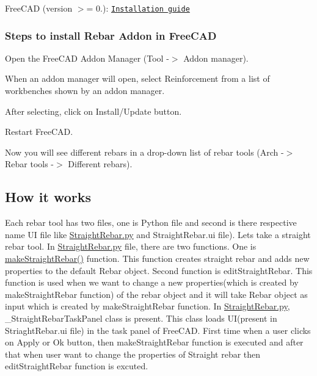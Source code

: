 \begin{DoxyItemize}
\item Free\+C\+AD (version $>$= 0.)\+: \href{https://www.freecadweb.org/wiki/Installing}{\tt Installation guide}
\end{DoxyItemize}

\subsubsection*{Steps to install Rebar Addon in Free\+C\+AD}


\begin{DoxyEnumerate}
\item Open the Free\+C\+AD Addon Manager ({\ttfamily Tool -\/$>$ Addon manager}).
\item When an addon manager will open, select {\ttfamily Reinforcement} from a list of workbenches shown by an addon manager.
\item After selecting, click on {\ttfamily Install/\+Update} button.
\item Restart Free\+C\+AD.
\item Now you will see different rebars in a drop-\/down list of rebar tools ({\ttfamily Arch -\/$>$ Rebar tools -\/$>$ Different rebars}).
\end{DoxyEnumerate}

\subsection*{How it works}

Each rebar tool has two files, one is {\ttfamily Python} file and second is there respective name {\ttfamily UI} file like {\ttfamily \hyperlink{StraightRebar_8py}{Straight\+Rebar.\+py}} and {\ttfamily Straight\+Rebar.\+ui} file). Let\textquotesingle{}s take a straight rebar tool. In {\ttfamily \hyperlink{StraightRebar_8py}{Straight\+Rebar.\+py}} file, there are two functions. One is {\ttfamily \hyperlink{namespaceStraightRebar_af6270367d7beae457813e33718d80faf}{make\+Straight\+Rebar()}} function. This function creates straight rebar and adds new properties to the default {\ttfamily Rebar} object. Second function is {\ttfamily edit\+Straight\+Rebar}. This function is used when we want to change a new properties(which is created by {\ttfamily make\+Straight\+Rebar} function) of the rebar object and it will take {\ttfamily Rebar} object as input which is created by {\ttfamily make\+Straight\+Rebar} function. In {\ttfamily \hyperlink{StraightRebar_8py}{Straight\+Rebar.\+py}}, {\ttfamily \+\_\+\+Straight\+Rebar\+Task\+Panel} class is present. This class loads UI(present in {\ttfamily Striaght\+Rebar.\+ui} file) in the task panel of Free\+C\+AD. First time when a user clicks on {\ttfamily Apply} or {\ttfamily Ok} button, then {\ttfamily make\+Straight\+Rebar} function is executed and after that when user want to change the properties of Straight rebar then {\ttfamily edit\+Straight\+Rebar} function is excuted.

